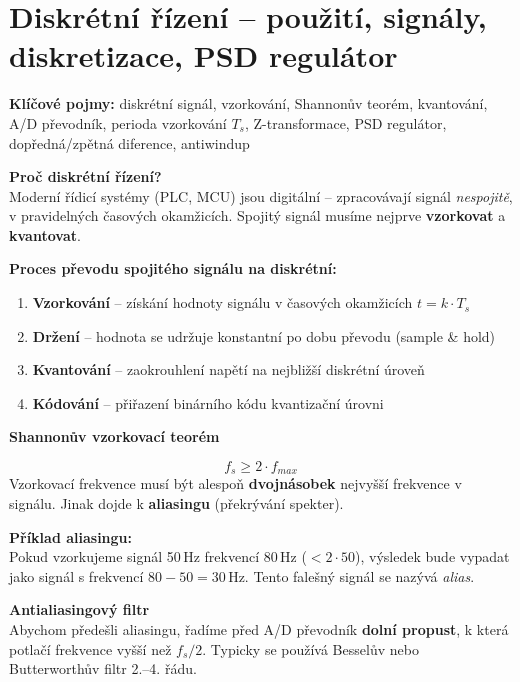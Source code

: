 \documentclass[a4paper,10pt]{article}
\begin{document}
\section{Diskrétní řízení -- použití, signály, diskretizace, PSD regulátor}

\begin{pojmybox}
\textbf{Klíčové pojmy:}
diskrétní signál, vzorkování, Shannonův teorém, kvantování,
A/D převodník, perioda vzorkování $T_s$, Z-transformace,
PSD regulátor, dopředná/zpětná diference, antiwindup
\end{pojmybox}

\begin{vysvetlenibox}
\textbf{Proč diskrétní řízení?}\\
Moderní řídicí systémy (PLC, MCU) jsou digitální -- zpracovávají signál
\textit{nespojitě}, v pravidelných časových okamžicích.
Spojitý signál musíme nejprve \textbf{vzorkovat} a \textbf{kvantovat}.

\textbf{Proces převodu spojitého signálu na diskrétní:}
\begin{enumerate}[noitemsep, leftmargin=1.4em, topsep=4pt]
    \item \textbf{Vzorkování} -- získání hodnoty signálu v časových okamžicích $t = k \cdot T_s$
    \item \textbf{Držení} -- hodnota se udržuje konstantní po dobu převodu (sample \& hold)
    \item \textbf{Kvantování} -- zaokrouhlení napětí na nejbližší diskrétní úroveň
    \item \textbf{Kódování} -- přiřazení binárního kódu kvantizační úrovni
\end{enumerate}

\textbf{Shannonův vzorkovací teorém}

\begin{vzorcebox}
$$f_s \geq 2 \cdot f_{max}$$
Vzorkovací frekvence musí být alespoň \textbf{dvojnásobek} nejvyšší
frekvence v signálu. Jinak dojde k \textbf{aliasingu} (překrývání spekter).
\end{vzorcebox}

\textbf{Příklad aliasingu:}\\
Pokud vzorkujeme signál 50\,Hz frekvencí 80\,Hz ($< 2 \cdot 50$),
výsledek bude vypadat jako signál s frekvencí $80 - 50 = 30$\,Hz.
Tento falešný signál se nazývá \textit{alias}.

\textbf{Antialiasingový filtr}\\
Abychom předešli aliasingu, řadíme před A/D převodník \textbf{dolní propust},
k která potlačí frekvence vyšší než $f_s / 2$. Typicky se používá
Besselův nebo Butterworthův filtr 2.--4. řádu.


\end{vysvetlenibox}
\end{document}
